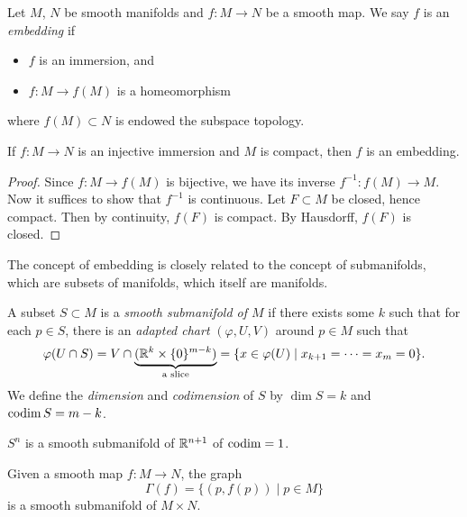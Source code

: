 \begin{definition}
  Let \(M\), \(N\) be smooth manifolds and \(f:M\to N\) be a smooth map. We say \(f\) is an \emph{embedding} if \begin{itemize}
    \item \(f\) is an immersion, and
    \item \(f:M\to f(M)\) is a homeomorphism
  \end{itemize}
  where \(f(M)\subset N\) is endowed the subspace topology.
\end{definition}

\begin{proposition}
  If \(f:M\to N\) is an injective immersion and \(M\) is compact, then \(f\) is an embedding.
\end{proposition}
\begin{proof}
  Since \(f:M\to f(M)\) is bijective, we have its inverse \(f^{-1}:f(M)\to M\). Now it suffices to show that \(f^{-1}\) is continuous. Let \(F\subset M\) be closed, hence compact. Then by continuity, \(f(F)\) is compact. By Hausdorff, \(f(F)\) is closed.
\end{proof}

The concept of embedding is closely related to the concept of submanifolds, which are subsets of manifolds, which itself are manifolds.

\begin{definition}
  A subset \(S\subset M\) is a \emph{smooth submanifold of \(M\)} if there exists some \(k\) such that for each \(p\in S\), there is an \emph{adapted chart} \((\varphi,U,V)\) around \(p\in M\) such that \[
    \varphi(U\cap S) = V\cap \underbrace{(\mathbb{R}^k\times\{0\}^{m-k})}_{\text{a slice}} = \{x\in\varphi(U)\mid x_{k+1} = \cdots = x_m = 0\}.
  \]
  We define the \emph{dimension} and \emph{codimension} of \(S\) by \(\dim S = k\) and \(\operatorname{codim} S = m - k\).
\end{definition}

\begin{center}
  
\end{center}

\begin{example}
  \(S^n\) is a smooth submanifold of \(\mathbb{R}^{n+1}\) of \(\operatorname{codim} = 1\).
\end{example}

\begin{example}
  Given a smooth map \(f:M\to N\), the graph \[
    \Gamma(f) = \{(p,f(p))\mid p\in M\}
  \] is a smooth submanifold of \(M\times N\).
\end{example}

